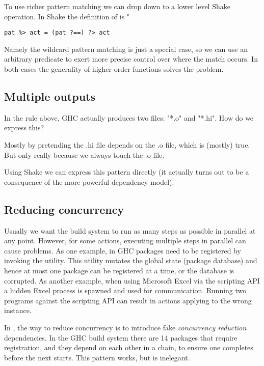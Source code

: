 To use richer pattern matching we can drop down to a lower level Shake operation. In Shake the definition of is \lst"%

\begin{verbatim}
pat %> act = (pat ?==) ?> act
\end{verbatim}

Namely the wildcard pattern matching is just a special case, so we can use an arbitrary predicate to exert more precise control over where the match occurs. In both cases the generality of higher-order functions solves the problem.

\subsection{Multiple outputs}


In the rule above, GHC actually produces two files: \lst"*.o" and \lst"*.hi". How do we express this?

Mostly by pretending the .hi file depends on the .o file, which is (mostly) true. But only really because we always touch the .o file.

Using Shake we can express this pattern directly (it actually turns out to be a consequence of the more powerful dependency model).

\subsection{Reducing concurrency}

Usually we want the build system to run as many steps as possible in parallel at any point. However, for some actions, executing multiple steps in parallel can cause problems. As one example, in GHC packages need to be registered by invoking the  utility. This utility mutates the global state (package database) and hence at most one package can be registered at a time, or the database is corrupted. As another example, when using Microsoft Excel via the scripting API a hidden Excel process is spawned and used for communication. Running two programs against the scripting API can result in actions applying to the wrong instance.

In \make{}, the way to reduce concurrency is to introduce fake \emph{concurrency reduction} dependencies. In the GHC build system there are 14 packages that require registration, and they depend on each other in a chain, to ensure one completes before the next starts. This pattern works, but is inelegant.

